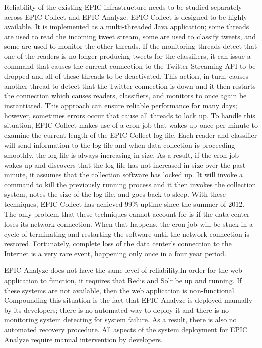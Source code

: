 Reliability of the existing EPIC infrastructure needs to be studied separately across EPIC Collect and EPIC Analyze. EPIC Collect is designed to be highly available. It is implemented as a multi-threaded Java application; some threads are used to read the incoming tweet stream, some are used to classify tweets, and some are used to monitor the other threads. If the monitoring threads detect that one of the readers is no longer producing tweets for the classifiers, it can issue a command that causes the current connection to the Twitter Streaming API to be dropped and all of these threads to be deactivated. This action, in turn, causes another thread to detect that the Twitter connection is down and it then restarts the connection which causes readers, classifiers, and monitors to once again be instantiated. This approach can ensure reliable performance for many days; however, sometimes errors occur that cause all threads to lock up. To handle this situation, EPIC Collect makes use of a cron job that wakes up once per minute to examine the current length of the EPIC Collect log file. Each reader and classifier will send information to the log file and when data collection is proceeding smoothly, the log file is always increasing in size. As a result, if the cron job wakes up and discovers that the log file has not increased in size over the past minute, it assumes that the collection software has locked up. It will invoke a command to kill the previously running process and it then invokes the collection system, notes the size of the log file, and goes back to sleep. With these techniques, EPIC Collect has achieved 99\% uptime since the summer of 2012. The only problem that these techniques cannot account for is if the data center loses its network connection. When that happens, the cron job will be stuck in a cycle of terminating and restarting the software until the network connection is restored. Fortunately, complete loss of the data center’s connection to the Internet is a very rare event, happening only once in a four year period.

EPIC Analyze does not have the same level of reliability.In order for the web application to function, it requires that Redis and Solr be up and running. If these systems are not available, then the web application is non-functional. Compounding this situation is the fact that EPIC Analyze is deployed manually by its developers; there is no automated way to deploy it and there is no monitoring system detecting for system failure. As a result, there is also no automated recovery procedure. All aspects of the system deployment for EPIC Analyze require manual intervention by developers.


